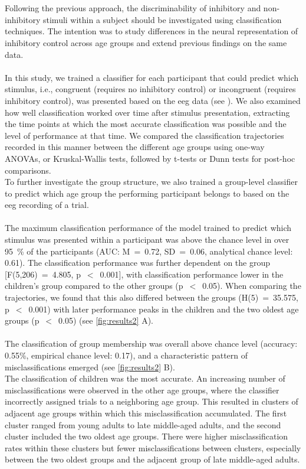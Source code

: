 \hyperref[pub:paperII]{}\\
\\
Following the previous approach, the discriminability of inhibitory and non-inhibitory stimuli within a subject should be investigated using classification techniques. The intention was to study differences in the neural representation of inhibitory control across age groups and extend previous findings on the same data.\\
\\
In this study, we trained a classifier for each participant that could predict which stimulus, i.e., congruent (requires no inhibitory control) or incongruent (requires inhibitory control), was presented based on the \gls{eeg} data (see ). We also examined how well classification worked over time after stimulus presentation, extracting the time points at which the most accurate classification was possible and the level of performance at that time. We compared the classification trajectories recorded in this manner between the different age groups using one-way ANOVAs, or Kruskal-Wallis tests, followed by t-tests or Dunn tests for post-hoc comparisons.\\
To further investigate the group structure, we also trained a group-level classifier to predict which age group the performing participant belongs to based on the \gls{eeg} recording of a trial.\\
\\
The maximum classification performance of the model trained to predict which stimulus was presented within a participant was above the chance level in over 95~\% of the participants (AUC: M~=~0.72, SD~=~0.06, analytical chance level: 0.61). The classification performance was further dependent on the group [F(5,206)~=~4.805, p~$<$~0.001], with classification performance lower in the children's group compared to the other groups (p~$<$~0.05). When comparing the trajectories, we found that this also differed between the groups (H(5)~=~35.575, p~$<$~0.001) with later performance peaks in the children and the two oldest age groups (p~$<$~0.05) (see \autoref{fig:results2} A).\\
\\
The classification of group membership was overall above chance level (accuracy: 0.55\%, empirical chance level: 0.17), and a characteristic pattern of misclassifications emerged (see \autoref{fig:results2} B).\\
The classification of children was the most accurate. An increasing number of misclassifications were observed in the other age groups, where the classifier incorrectly assigned trials to a neighboring age group. This resulted in clusters of adjacent age groups within which this misclassification accumulated. The first cluster ranged from young adults to late middle-aged adults, and the second cluster included the two oldest age groups. There were higher misclassification rates within these clusters but fewer misclassifications between clusters, especially between the two oldest groups and the adjacent group of late middle-aged adults.\\

